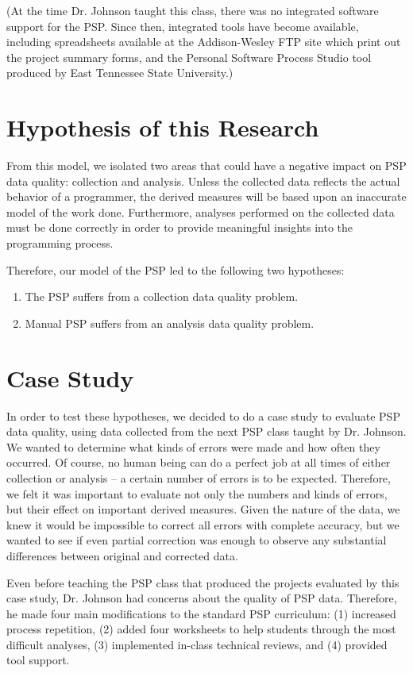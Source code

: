 (At the time Dr. Johnson taught this class, there was no integrated software 
support for the PSP.  Since then, integrated tools have become available,
including spreadsheets available at the Addison-Wesley FTP site which print 
out the project summary forms, and the Personal Software Process Studio
tool produced by East Tennessee State University.)

\section{Hypothesis of this Research}

From this model, we isolated two areas that could have a negative impact on
PSP data quality: collection and analysis.  Unless the collected data
reflects the actual behavior of a programmer, the derived measures will be
based upon an inaccurate model of the work done. Furthermore, analyses
performed on the collected data must be done correctly in order to provide
meaningful insights into the programming process.

Therefore, our model of the PSP led to the following two hypotheses:

\begin{enumerate}
\item The PSP suffers from a collection data quality problem.
\item Manual PSP suffers from an analysis data quality problem.
\end{enumerate}

\section{Case Study}

In order to test these hypotheses, we decided to do a case study to
evaluate PSP data quality, using data collected from the next PSP class
taught by Dr.  Johnson.  We wanted to determine what kinds of errors were
made and how often they occurred.  Of course, no human being can do a
perfect job at all times of either collection or analysis -- a certain
number of errors is to be expected.  Therefore, we felt it was important to
evaluate not only the numbers and kinds of errors, but their effect on
important derived measures. Given the nature of the data, we knew it would
be impossible to correct all errors with complete accuracy, but we wanted
to see if even partial correction was enough to observe any substantial
differences between original and corrected data.

Even before teaching the PSP class that produced the projects evaluated by
this case study, Dr. Johnson had concerns about the quality of PSP data.
Therefore, he made four main modifications to the standard PSP curriculum:
(1) increased process repetition, (2) added four worksheets to help
students through the most difficult analyses, (3) implemented in-class
technical reviews, and (4) provided tool support.

